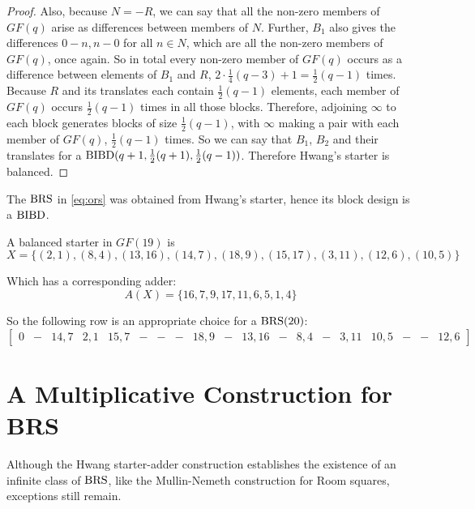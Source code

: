 \begin{proof}
Also, because $N = -R$, we can say that all the non-zero members of $GF(q)$ arise as differences between members of $N$.
Further, $B_1$ also gives the differences $0 - n, n - 0$ for all $n\in N$, which are all the non-zero members of $GF(q)$, once again.
So in total every non-zero member of $GF(q)$ occurs as a difference between elements of $B_1$ and $R$, $2 \cdot \frac{1}{4}(q - 3) + 1 = \frac{1}{2} (q - 1)$ times.
Because $R$ and its translates each contain $\frac{1}{2}(q - 1)$ elements, each member of $GF(q)$ occurs $\frac{1}{2}(q - 1)$ times in all those blocks.
Therefore, adjoining $\infty$ to each block generates blocks of size $\frac{1}{2}(q - 1)$, with $\infty$ making a pair with each member of $GF(q)$, $\frac{1}{2}(q - 1)$ times.
So we can say that $B_1$, $B_2$ and their translates for a $\operatorname{BIBD}(q  +1, \frac{1}{2}(q + 1), \frac{1}{2}(q - 1))$.
Therefore Hwang’s starter is balanced. 
\end{proof}

The $\operatorname{BRS}$ in \eqref{eq:ors} was obtained from Hwang’s starter, hence its block design is a $\operatorname{BIBD}$.

\begin{example}
A balanced starter in $GF(19)$ is
\begin{equation}
X = \{(2,1),(8,4),(13,16),(14,7),(18,9),(15,17),(3,11),(12,6),(10,5)\}
\end{equation}

Which has a corresponding adder:
\begin{equation}
A(X) = \{16,7,9,17,11,6,5,1,4\}
\end{equation}

So the following row is an appropriate choice for a $\operatorname{BRS}(20)$:
\begin{equation}
 \begin{bmatrix}
   0 & - & 14,7 & 2,1 & 15,7 & - & - & - & 18,9 & - & 13,16 & - & 8,4 & - & 3,11 & 10,5 & - & - & 12,6
 \end{bmatrix}
\end{equation}

\end{example}

\section{A Multiplicative Construction for BRS}

Although the Hwang starter-adder construction establishes the existence of an infinite class of $\operatorname{BRS}$, like the Mullin-Nemeth construction for Room squares, exceptions still remain.

